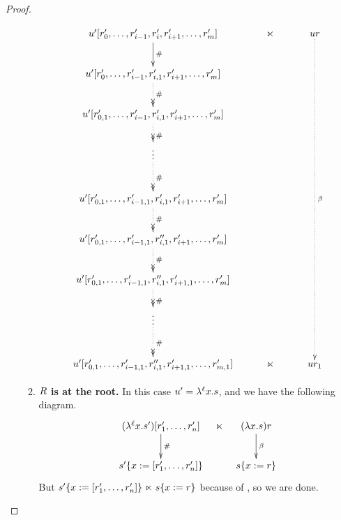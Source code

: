 \begin{proof}
\begin{enumerate}
\begin{enumerate}
    \[
    \xymatrix@C=1cm{
    \tmthree' [\tmfour'_0, \hdots, \tmfour'_{i-1}, \tmfour'_i, \tmfour'_{i+1}, \hdots, \tmfour'_m]
      \ar[d]^{\dist} & \refines & \tmthree \tmfour \ar@{.>}[dddddddd]^{\beta} \\
    \tmthree' [\tmfour'_0, \hdots, \tmfour'_{i-1}, \tmfour'_{i,1}, \tmfour'_{i+1}, \hdots, \tmfour'_m] \ar@{.>>}[d]^{\dist} & & \\
    \tmthree' [\tmfour'_{0, 1}, \hdots, \tmfour'_{i-1}, \tmfour'_{i,1}, \tmfour'_{i+1}, \hdots, \tmfour'_m] \ar@{.>>}[d]^{\dist} & & \\
    \vdots \ar@{.>>}[d]^{\dist} & & \\
    \tmthree' [\tmfour'_{0, 1}, \hdots, \tmfour'_{i-1,1}, \tmfour'_{i,1}, \tmfour'_{i+1}, \hdots, \tmfour'_m] \ar@{.>>}[d]^{\dist} & & \\
    \tmthree' [\tmfour'_{0, 1}, \hdots, \tmfour'_{i-1,1}, \tmfour''_{i,1}, \tmfour'_{i+1}, \hdots, \tmfour'_m] \ar@{.>>}[d]^{\dist} & & \\
    \tmthree' [\tmfour'_{0, 1}, \hdots, \tmfour'_{i-1,1}, \tmfour''_{i,1}, \tmfour'_{i+1,1}, \hdots, \tmfour'_m] \ar@{.>>}[d]^{\dist} & & \\
    \vdots \ar@{.>>}[d]^{\dist} & & \\
    \tmthree' [\tmfour'_{0, 1}, \hdots, \tmfour'_{i-1,1}, \tmfour''_{i,1}, \tmfour'_{i+1,1}, \hdots, \tmfour'_{m,1}] & \refines  & \tmthree \tmfour_1                    \\
    }
    \]
  \item {\bf $R$ is at the root.} In this case $u' = \lambda^{\ell} x. s$, and
    we have the following diagram.
  \[
  \xymatrix@C=.25cm{
  (\lamp{\lab}{\var}{\tmtwo'}) [\tmfour'_1, \hdots, \tmfour'_n] \ar[d]^{\dist} & \refines & (\lam{\var}{\tmtwo}) \tmfour
  \ar@{->}[d]^{\beta}\\
  \subs{\tmtwo'}{\var}{[\tmfour'_1, \hdots, \tmfour'_n]} &  & \subs{\tmtwo}{\var}{\tmfour} \\
  }
  \]
  But $s'\{x := [r'_1, \hdots, r'_n]\} \mathrel{\ltimes} s\{x := r\}$
  because of , so we are done.
  \end{enumerate}
\end{enumerate}
\end{proof}
